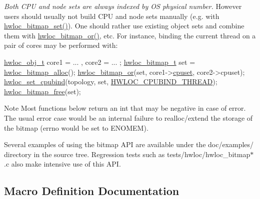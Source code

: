 {\itshape Both C\+PU and node sets are always indexed by OS physical number.} However users should usually not build C\+PU and node sets manually (e.\+g. with \hyperlink{a00205_ga062dbff93baeff3b425a7260c5463646}{hwloc\+\_\+bitmap\+\_\+set()}). One should rather use existing object sets and combine them with \hyperlink{a00205_ga120b8aefb9ce7ef349929656359b1859}{hwloc\+\_\+bitmap\+\_\+or()}, etc. For instance, binding the current thread on a pair of cores may be performed with\+: 
\begin{DoxyCode}
\hyperlink{a00238}{hwloc\_obj\_t} core1 = ... , core2 = ... ;
\hyperlink{a00205_gaa3c2bf4c776d603dcebbb61b0c923d84}{hwloc\_bitmap\_t} \textcolor{keyword}{set} = \hyperlink{a00205_gadece3d1eb5199fc2fb99bc7dcf1ccc05}{hwloc\_bitmap\_alloc}();
\hyperlink{a00205_ga120b8aefb9ce7ef349929656359b1859}{hwloc\_bitmap\_or}(\textcolor{keyword}{set}, core1->\hyperlink{a00238_a67925e0f2c47f50408fbdb9bddd0790f}{cpuset}, core2->cpuset);
\hyperlink{a00190_ga80bc07473a8edf840cae17bd7ec21d48}{hwloc\_set\_cpubind}(topology, \textcolor{keyword}{set}, \hyperlink{a00190_gga217dc8d373f8958cc93c154ebce1c71caf1b6bbad00d7b1017b918e3719f4d421}{HWLOC\_CPUBIND\_THREAD});
\hyperlink{a00205_ga156130d85b3a0674d6e0e6770fe68fbe}{hwloc\_bitmap\_free}(\textcolor{keyword}{set});
\end{DoxyCode}


\begin{DoxyNote}{Note}
Most functions below return an int that may be negative in case of error. The usual error case would be an internal failure to realloc/extend the storage of the bitmap ({\ttfamily errno} would be set to {\ttfamily E\+N\+O\+M\+EM}).

Several examples of using the bitmap A\+PI are available under the doc/examples/ directory in the source tree. Regression tests such as tests/hwloc/hwloc\+\_\+bitmap$\ast$.c also make intensive use of this A\+PI. 
\end{DoxyNote}


\subsection{Macro Definition Documentation}
\mbox{\label{a00205_ga3f6861045a8029ade373510ffa727d2a}} 
